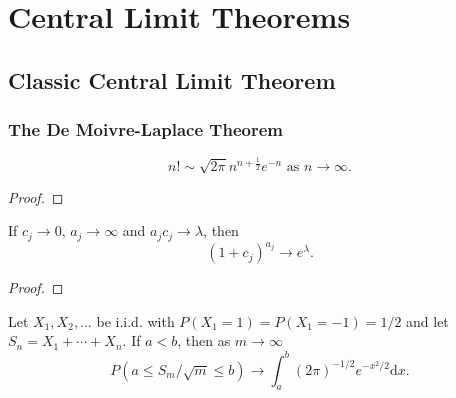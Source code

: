 \chapter{Central Limit Theorems}


\section{Classic Central Limit Theorem}

\subsection{The De Moivre-Laplace Theorem}

\begin{lemma} \label{lem:stirling}
	\begin{equation}
		n ! \sim \sqrt{2 \pi} n^{n+\frac{1}{2}} e^{-n} \text{ as } n \rightarrow \infty.
	\end{equation}
\end{lemma}

\begin{proof}

\end{proof}

\begin{lemma} \label{lem:exp}
	If $c_j\rightarrow 0$, $a_j\rightarrow\infty$ and $a_jc_j\rightarrow\lambda$, then
	\begin{equation}
		\left(1+c_j\right)^{a_j}\rightarrow e^\lambda.
	\end{equation}
\end{lemma}

\begin{proof}

\end{proof}

\begin{theorem} \label{thm:de-moivre-laplace}
	Let $X_{1}, X_{2}, \ldots$ be i.i.d. with $P\left(X_{1}=1\right)=P\left(X_{1}=-1\right)=1 / 2$ and let $S_{n}=X_{1}+\cdots+X_{n}$. If $a<b$, then as $m \rightarrow \infty$
	\begin{equation}
		P\left(a \leq S_{m} / \sqrt{m} \leq b\right) \rightarrow \int_{a}^{b}(2 \pi)^{-1 / 2} e^{-x^{2} / 2} \mathrm{d} x.
	\end{equation}
\end{theorem}

